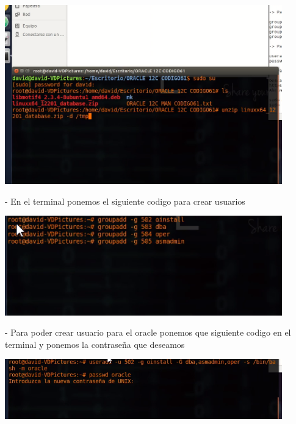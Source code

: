 \documentclass[12pt,letterpaper]{article}
\begin{document}
\begin{center}
	\includegraphics[width=12cm]{./Imagenes/24} 
\end{center}


\begin{itemize}
- En el terminal ponemos el siguiente codigo para crear usuarios\\
\end{itemize}

\begin{center}
	\includegraphics[width=12cm]{./Imagenes/25} 
\end{center}



\begin{itemize}
- Para poder crear usuario para el oracle ponemos que siguiente codigo en el terminal y ponemos la contraseña que deseamos\\
\end{itemize}

\begin{center}
	\includegraphics[width=12cm]{./Imagenes/26} 
\end{center}
\end{document}
